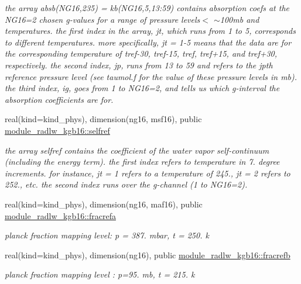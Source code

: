 \begin{Indent}
\begin{DoxyCompactItemize}
\begin{DoxyCompactList}\small\item\em the array absb(\+N\+G16,235) = kb(\+N\+G16,5,13\+:59) contains absorption coefs at the N\+G16=2 chosen g-\/values for a range of pressure levels$<$ $\sim$100mb and temperatures. the first index in the array, jt, which runs from 1 to 5, corresponds to different temperatures. more specifically, jt = 1-\/5 means that the data are for the corresponding temperature of tref-\/30, tref-\/15, tref, tref+15, and tref+30, respectively. the second index, jp, runs from 13 to 59 and refers to the jpth reference pressure level (see taumol.\+f for the value of these pressure levels in mb). the third index, ig, goes from 1 to N\+G16=2, and tells us which g-\/interval the absorption coefficients are for. \end{DoxyCompactList}\item 
real(kind=kind\+\_\+phys), dimension(ng16, msf16), public \hyperlink{group__module__radlw__kgbnn_gafaa2554e1161bd6c983ce630d39d703a}{module\+\_\+radlw\+\_\+kgb16\+::selfref}
\begin{DoxyCompactList}\small\item\em the array selfref contains the coefficient of the water vapor self-\/continuum (including the energy term). the first index refers to temperature in 7. degree increments. for instance, jt = 1 refers to a temperature of 245., jt = 2 refers to 252., etc. the second index runs over the g-\/channel (1 to N\+G16=2). \end{DoxyCompactList}\item 
real(kind=kind\+\_\+phys), dimension(ng16, maf16), public \hyperlink{group__module__radlw__kgbnn_ga355dcc9f6f4955ab3d7ee0a22005c8ba}{module\+\_\+radlw\+\_\+kgb16\+::fracrefa}
\begin{DoxyCompactList}\small\item\em planck fraction mapping level\+: p = 387. mbar, t = 250. k \end{DoxyCompactList}\item 
real(kind=kind\+\_\+phys), dimension(ng16), public \hyperlink{group__module__radlw__kgbnn_gab93affafac8e2bb182982133a6449de4}{module\+\_\+radlw\+\_\+kgb16\+::fracrefb}
\begin{DoxyCompactList}\small\item\em planck fraction mapping level \+: p=95. mb, t = 215. k \end{DoxyCompactList}\end{DoxyCompactItemize}
\end{Indent}


